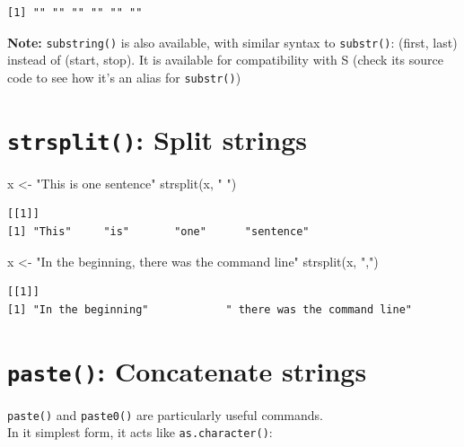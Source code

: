 \documentclass[
]{book}
\newenvironment{Shaded}{\begin{snugshade}}{\end{snugshade}}
\newcommand{\FunctionTok}[1]{\textcolor[rgb]{0.00,0.00,0.00}{#1}}
\newcommand{\NormalTok}[1]{#1}
\newcommand{\OtherTok}[1]{\textcolor[rgb]{0.56,0.35,0.01}{#1}}
\newcommand{\StringTok}[1]{\textcolor[rgb]{0.31,0.60,0.02}{#1}}
\begin{document}
\begin{verbatim}
[1] "" "" "" "" "" ""
\end{verbatim}

\textbf{Note:} \texttt{substring()} is also available, with similar syntax to \texttt{substr()}: (first, last) instead of (start, stop). It is available for compatibility with S (check its source code to see how it's an alias for \texttt{substr()})

\hypertarget{strsplit-split-strings}{%
\section{\texorpdfstring{\texttt{strsplit()}: Split strings}{strsplit(): Split strings}}\label{strsplit-split-strings}}

\begin{Shaded}
\begin{Highlighting}[]
\NormalTok{x }\OtherTok{\textless{}{-}} \StringTok{"This is one sentence"}
\FunctionTok{strsplit}\NormalTok{(x, }\StringTok{" "}\NormalTok{)}
\end{Highlighting}
\end{Shaded}

\begin{verbatim}
[[1]]
[1] "This"     "is"       "one"      "sentence"
\end{verbatim}

\begin{Shaded}
\begin{Highlighting}[]
\NormalTok{x }\OtherTok{\textless{}{-}} \StringTok{"In the beginning, there was the command line"}
\FunctionTok{strsplit}\NormalTok{(x, }\StringTok{","}\NormalTok{)}
\end{Highlighting}
\end{Shaded}

\begin{verbatim}
[[1]]
[1] "In the beginning"            " there was the command line"
\end{verbatim}

\hypertarget{paste-concatenate-strings}{%
\section{\texorpdfstring{\texttt{paste()}: Concatenate strings}{paste(): Concatenate strings}}\label{paste-concatenate-strings}}

\texttt{paste()} and \texttt{paste0()} are particularly useful commands.\\
In it simplest form, it acts like \texttt{as.character()}:
\end{document}
